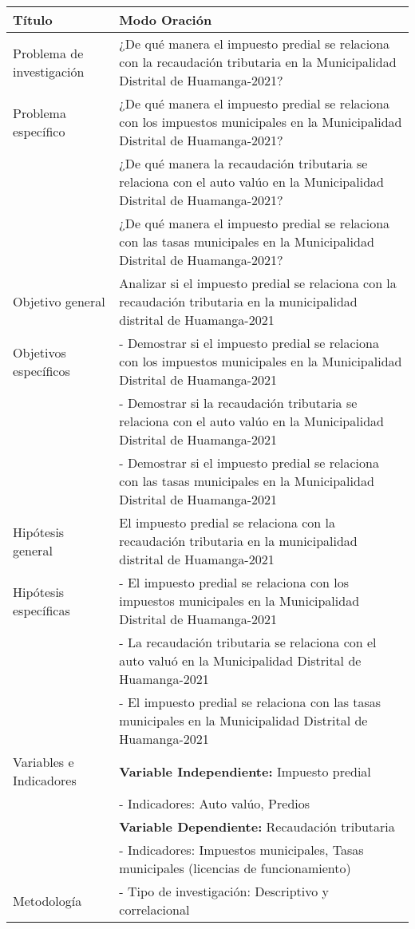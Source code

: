 \documentclass[
  man,
  floatsintext,
  longtable,
  a4paper,
  nolmodern,
  notxfonts,
  notimes,
  colorlinks=true,linkcolor=blue,citecolor=blue,urlcolor=blue]{apa7}
\begin{document}
\begin{longtable}[]{@{}
  >{\raggedright\arraybackslash}p{}
  >{\raggedright\arraybackslash}p{}@{}}
\toprule\noalign{}
\begin{minipage}[b]{\linewidth}\raggedright
Título
\end{minipage} & \begin{minipage}[b]{\linewidth}\raggedright
Modo Oración
\end{minipage} \\
\midrule\noalign{}
\endhead
\bottomrule\noalign{}
\endlastfoot
Problema de investigación & ¿De qué manera el impuesto predial se
relaciona con la recaudación tributaria en la Municipalidad Distrital de
Huamanga-2021? \\
Problema específico & ¿De qué manera el impuesto predial se relaciona
con los impuestos municipales en la Municipalidad Distrital de
Huamanga-2021? \\
& ¿De qué manera la recaudación tributaria se relaciona con el auto
valúo en la Municipalidad Distrital de Huamanga-2021? \\
& ¿De qué manera el impuesto predial se relaciona con las tasas
municipales en la Municipalidad Distrital de Huamanga-2021? \\
Objetivo general & Analizar si el impuesto predial se relaciona con la
recaudación tributaria en la municipalidad distrital de Huamanga-2021 \\
Objetivos específicos & - Demostrar si el impuesto predial se relaciona
con los impuestos municipales en la Municipalidad Distrital de
Huamanga-2021 \\
& - Demostrar si la recaudación tributaria se relaciona con el auto
valúo en la Municipalidad Distrital de Huamanga-2021 \\
& - Demostrar si el impuesto predial se relaciona con las tasas
municipales en la Municipalidad Distrital de Huamanga-2021 \\
Hipótesis general & El impuesto predial se relaciona con la recaudación
tributaria en la municipalidad distrital de Huamanga-2021 \\
Hipótesis específicas & - El impuesto predial se relaciona con los
impuestos municipales en la Municipalidad Distrital de Huamanga-2021 \\
& - La recaudación tributaria se relaciona con el auto valuó en la
Municipalidad Distrital de Huamanga-2021 \\
& - El impuesto predial se relaciona con las tasas municipales en la
Municipalidad Distrital de Huamanga-2021 \\
Variables e Indicadores & \textbf{Variable Independiente:} Impuesto
predial \\
& - Indicadores: Auto valúo, Predios \\
& \textbf{Variable Dependiente:} Recaudación tributaria \\
& - Indicadores: Impuestos municipales, Tasas municipales (licencias de
funcionamiento) \\
Metodología & - Tipo de investigación: Descriptivo y correlacional \\
\end{longtable}
\end{document}
